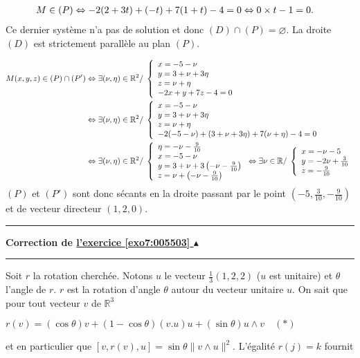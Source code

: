 \documentclass[11pt,a4paper]{article}
\newcommand{\Rr}{\mathbb{R}} \newcommand{\R}{\mathbb{R}}
\newcounter{exo}
\newcommand{\correction}[1]{\hypertarget{cor7:#1}{}\label{cor7:#1}{\bf Correction de \hyperlink{exo7:#1}{l'exercice \ref{exo7:#1} $\blacktriangle$}}\vspace{1mm}\hrule\vspace{1mm}}
\newcommand{\fincorrection}{\vspace{1mm}\hrule\vspace*{7mm}}
\begin{document}
\begin{align*}\ensuremath
M\in(P)&\Leftrightarrow-2(2+3t)+(-t)+7(1+t)-4=0
\Leftrightarrow
0\times t-1=0.
\end{align*}
Ce dernier système n'a pas de solution et donc $(D)\cap(P)=\varnothing$. La droite $(D)$ est strictement parallèle au plan $(P)$.

\begin{align*}\ensuremath
M(x,y,z)\in(P)\cap(P')&\Leftrightarrow\exists(\nu,\eta)\in\Rr^2/\;\left\{
\begin{array}{l}
x=-5-\nu\\
y=3+\nu+3\eta\\
z=\nu+\eta\\
-2x+y+7z-4=0
\end{array}
\right.\\
 &\Leftrightarrow\exists(\nu,\eta)\in\Rr^2/\;\left\{
\begin{array}{l}
x=-5-\nu\\
y=3+\nu+3\eta\\
z=\nu+\eta\\
-2(-5-\nu)+(3+\nu+3\eta)+7(\nu+\eta)-4=0
\end{array}
\right.\\
 &\Leftrightarrow\exists(\nu,\eta)\in\Rr^2/\;\left\{
\begin{array}{l}
\eta=-\nu-\frac{9}{10}\\
x=-5-\nu\\
y=3+\nu+3\left(-\nu-\frac{9}{10}\right)\\
z=\nu+\left(-\nu-\frac{9}{10}\right)
\end{array}
\right.
\Leftrightarrow
\exists\nu\in\Rr/\;
\left\{
\begin{array}{l}
x=-\nu-5\\
y=-2\nu+\frac{3}{10}\\
z=-\frac{9}{10}
\end{array}
\right.
\end{align*}
$(P)$ et $(P')$ sont donc sécants en la droite passant par le point $\left(-5,\frac{3}{10},-\frac{9}{10}\right)$ et de vecteur directeur $(1,2,0)$.
\fincorrection
\correction{005503}
Soit $r$ la rotation cherchée. Notons $u$ le vecteur $\frac{1}{3}(1,2,2)$ ($u$ est unitaire) et $\theta$ l'angle de $r$. $r$ est la rotation d'angle $\theta$ autour du vecteur unitaire $u$.  On sait que pour tout vecteur $v$ de $\Rr^3$

\begin{center}
$r(v)=(\cos\theta)v+(1-\cos\theta)(v.u)u+(\sin\theta) u\wedge v\quad(*)$
\end{center}
et en particulier que $[v,r(v),u]=\sin\theta\|v\wedge u\|^2$. L'égalité $r(j)=k$ fournit
\end{document}
